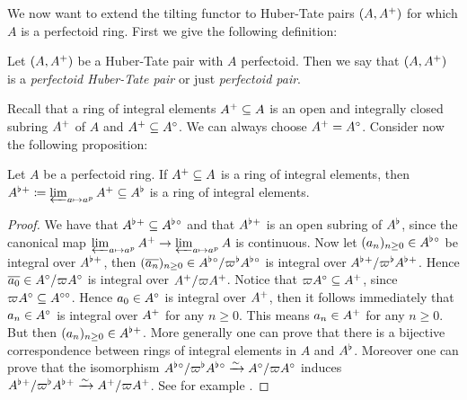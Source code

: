 We now want to extend the tilting functor to Huber-Tate pairs $(A,A{^{+}})$ for which $A$ is a perfectoid ring.
First we give the following definition:

\begin{definition}
Let $(A,A{^{+}})$ be a Huber-Tate pair with $A$  perfectoid. Then we say that $(A,A{^{+}})$ is a \emph{perfectoid Huber-Tate pair} or just \emph{perfectoid pair}.
\end{definition}

Recall that a ring of integral elements $A{^{+}}\subseteq A$ is an open and integrally closed subring $A{^{+}}$ of $A$ and $A{^{+}}\subseteq A{^{\circ}}$.
We can always choose $A{^{+}}=A{^{\circ}}$.
Consider now the following proposition:

\begin{prop}\label{inttiltprop}
Let $A$ be a perfectoid ring. If $A{^{+}}\subseteq A$ is a ring of integral elements, then $A^{\flat}{^{+}}\coloneqq\varprojlim_{a\mapsto a^p}A{^{+}}\subseteq A^{\flat}$
is a ring of integral elements.
\end{prop}
\begin{proof}
We have that $A^{\flat}{^{+}}\subseteq A^{\flat}{^{\circ}}$ and that $A^{\flat}{^{+}}$ is an open subring of $A^{\flat}$, since the canonical map
$\varprojlim_{a\mapsto a^p}A{^{+}}\to\varprojlim_{a\mapsto a^p}A$ is continuous.
Now let $(a_n)_{n\geq 0}\in A^{\flat}{^{\circ}}$ be integral over $A^{\flat}{^{+}}$, then $(\overline{a_n})_{n\geq0}\in A^{\flat}{^{\circ}}/\varpi^{\flat} A^{\flat}{^{\circ}}$ is integral over
$A^{\flat}{^{+}}/\varpi^{\flat} A^{\flat}{^{+}}$.
Hence $\overline{a_0}\in A{^{\circ}}/\varpi A{^{\circ}}$ is integral over $A{^{+}}/\varpi A{^{+}}$. 
Notice that $\varpi A{^{\circ}}\subseteq A{^{+}}$, since $\varpi A{^{\circ}}\subseteq A^{\circ\circ}$. Hence
$a_0\in A{^{\circ}}$ is integral over $A{^{+}}$, then it follows immediately that $a_n\in A{^{\circ}}$ is integral over $A{^{+}}$ for any $n\geq 0$.
This means $a_n\in A{^{+}}$ for any $n\geq 0$.
But then $(a_n)_{n\geq0}\in A^{\flat}{^{+}}$.
More generally one can prove that there is a bijective correspondence between rings of integral elements in $A$ and $A^{\flat}$.
Moreover one can prove that the isomorphism
$A^{\flat}{^{\circ}}/\varpi^{\flat} A^{\flat}{^{\circ}}\xrightarrow{\sim} A{^{\circ}}/\varpi A{^{\circ}}$
induces
$A^{\flat}{^{+}}/\varpi^{\flat} A^{\flat}{^{+}}\xrightarrow{\sim} A{^{+}}/\varpi A{^{+}}$.
See for example \cite[proposition V.1.2.5]{Morel19}.
\end{proof}

